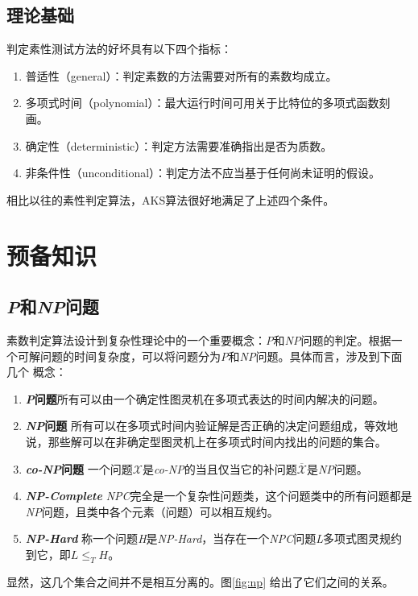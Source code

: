 \documentclass[a4paper,notitlepage]{article}
\numberwithin{equation}{section}
\begin{document}
\begin{multicols}{2}
  \subsection{理论基础}
  判定素性测试方法的好坏具有以下四个指标：
  \begin{enumerate}
  \item 普适性（general）：判定素数的方法需要对所有的素数均成立。
  \item 多项式时间（polynomial）：最大运行时间可用关于比特位的多项式函数刻画。
  \item 确定性（deterministic）：判定方法需要准确指出是否为质数。
  \item 非条件性（unconditional）：判定方法不应当基于任何尚未证明的假设。
  \end{enumerate}

  相比以往的素性判定算法，AKS算法很好地满足了上述四个条件。

  \section{预备知识}
  \subsection{\textit{P}和\textit{NP}问题}
  素数判定算法设计到复杂性理论中的一个重要概念：\textit{P}和\textit{NP}问题的判定。根据一个可解问题的时间复杂度，可以将问题分为\textit{P}和\textit{NP}问题。具体而言，涉及到下面几个
  概念：
  \begin{enumerate}
  \item \textbf{\textit{P}问题}\quad 所有可以由一个确定性图灵机在多项式表达的时间内解决的问题。
  \item \textbf{\textit{NP}问题}\quad
    所有可以在多项式时间内验证解是否正确的决定问题组成，等效地说，那些解可以在非确定型图灵机上在多项式时间内找出的问题的集合。
  \item \textbf{\textit{co-NP}问题}\quad
    一个问题$\mathcal{X}$是\textit{co-NP}的当且仅当它的补问题$\overline{\mathcal{X}}$是\textit{NP}问题。
  \item \textbf{\textit{NP-Complete}}\quad
    \textit{NPC}完全是一个复杂性问题类，这个问题类中的所有问题都是\textit{NP}问题，且类中各个元素（问题）可以相互规约。
  \item \textbf{\textit{NP-Hard}}\quad
    称一个问题\textit{H}是\textit{NP-Hard}，当存在一个\textit{NPC}问题\textit{L}多项式图灵规约到它，即$L\le _T H$。
  \end{enumerate}

  显然，这几个集合之间并不是相互分离的。图\ref{fig:np} 给出了它们之间的关系。


\end{multicols}
\end{document}
